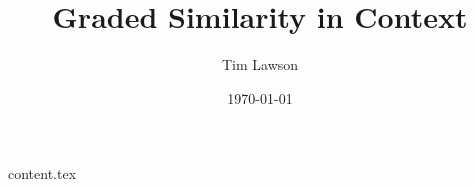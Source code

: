 \documentclass[10pt]{extarticle}
\begin{document}
\title{Graded Similarity in Context}
\author{Tim Lawson}
\date{\today}

\maketitle

{content.tex}

\printbibliography
\end{document}
